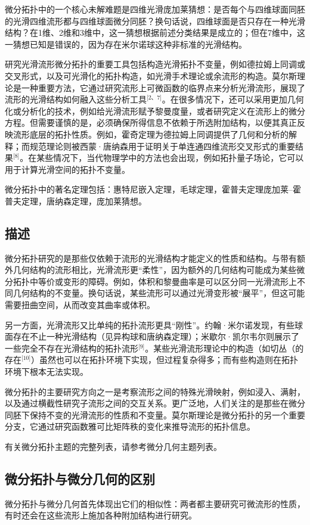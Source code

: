 微分拓扑中的一个核心未解难题是四维光滑庞加莱猜想：是否每个与四维球面同胚的光滑四维流形都与四维球面微分同胚？换句话说，四维球面是否只存在一种光滑结构？在1维、2维和3维中，这一猜想根据前述分类结果是成立的；但在7维中，这一猜想已知是错误的，因为存在米尔诺球这种非标准的光滑结构。

研究光滑流形微分拓扑的重要工具包括构造光滑拓扑不变量，例如德拉姆上同调或交叉形式，以及可光滑化的拓扑构造，如光滑手术理论或余流形的构造。莫尔斯理论是一种重要方法，它通过研究流形上可微函数的临界点来分析光滑流形，展现了流形的光滑结构如何融入这些分析工具\(^\text{[2、7]}\)。在很多情况下，还可以采用更加几何化或分析化的技术，例如给光滑流形赋予黎曼度量，或者研究定义在流形上的微分方程。但需要谨慎的是，必须确保所得信息不依赖于所选附加结构，以便其真正反映流形底层的拓扑性质。例如，霍奇定理为德拉姆上同调提供了几何和分析的解释；而规范理论则被西蒙·唐纳森用于证明关于单连通四维流形交叉形式的重要结果\(^\text{[8]}\)。在某些情况下，当代物理学中的方法也会出现，例如拓扑量子场论，它可以用于计算光滑空间的拓扑不变量。

微分拓扑中的著名定理包括：惠特尼嵌入定理，毛球定理，霍普夫定理庞加莱–霍普夫定理，唐纳森定理，庞加莱猜想。
\subsection{描述}
微分拓扑研究的是那些仅依赖于流形的光滑结构才能定义的性质和结构。与带有额外几何结构的流形相比，光滑流形更“柔性”，因为额外的几何结构可能成为某些微分拓扑中等价或变形的障碍。例如，体积和黎曼曲率是可以区分同一光滑流形上不同几何结构的不变量。换句话说，某些流形可以通过光滑变形被“展平”，但这可能需要扭曲空间，从而改变其曲率或体积。

另一方面，光滑流形又比单纯的拓扑流形更具“刚性”。约翰·米尔诺发现，有些球面存在不止一种光滑结构（见异构球和唐纳森定理）；米歇尔·凯尔韦尔则展示了一些完全不存在光滑结构的拓扑流形\(^\text{[9]}\)。某些光滑流形理论中的构造（如切丛（的存在\(^\text{[10]}\)）虽然也可以在拓扑环境下实现，但过程复杂得多；而有些构造则在拓扑环境下根本无法实现。

微分拓扑的主要研究方向之一是考察流形之间的特殊光滑映射，例如浸入、满射，以及通过横截性研究子流形之间的交互关系。更广泛地，人们关注的是那些在微分同胚下保持不变的光滑流形的性质和不变量。莫尔斯理论是微分拓扑的另一个重要分支，它通过研究函数雅可比矩阵秩的变化来推导流形的拓扑信息。

有关微分拓扑主题的完整列表，请参考微分几何主题列表。
\subsection{微分拓扑与微分几何的区别}
微分拓扑与微分几何首先体现出它们的相似性：两者都主要研究可微流形的性质，有时还会在这些流形上施加各种附加结构进行研究。
